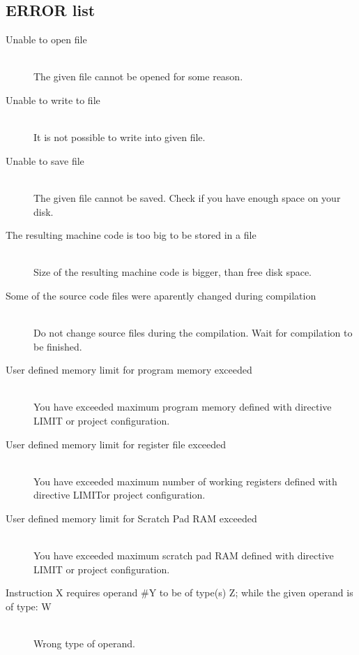                 \subsection{ERROR list}
                    \begin{description}
                    \item[Unable to open file] \hfill \\
                    The given file cannot be opened for some reason.
                    \item[Unable to write to file] \hfill \\
                    It is not possible to write into given file.
                    \item[Unable to save file] \hfill \\
                    The given file cannot be saved. Check if you have enough space on your disk.
                    \item[The resulting machine code is too big to be stored in a file]\hfill \\
                    Size of the resulting machine code is bigger, than free disk space.
                    \item[Some of the source code files were aparently changed during compilation]\hfill \\
                    Do not change source files during the compilation. Wait for compilation to be finished.
                    \item[User defined memory limit for program memory exceeded]\hfill \\
                    You have exceeded maximum program memory defined with directive LIMIT or project configuration.
                    \item[User defined memory limit for register file exceeded]\hfill \\
                    You have exceeded maximum number of working registers defined with directive LIMITor project configuration.
                    \item[User defined memory limit for Scratch Pad RAM exceeded]\hfill \\
                    You have exceeded maximum scratch pad RAM defined with directive LIMIT or project configuration.
                    \item[Instruction X requires operand \#Y to be of type(s) Z; while the given operand is of type: W] \hfill \\   %
                    Wrong type of operand. 

\end{description}
